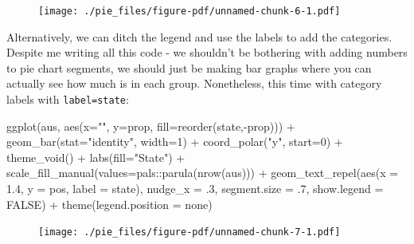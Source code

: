 \documentclass[
  letterpaper,
  DIV=11,
  numbers=noendperiod]{scrreprt}
\newenvironment{Shaded}{\begin{snugshade}}{\end{snugshade}}
\newcommand{\AttributeTok}[1]{\textcolor[rgb]{0.40,0.45,0.13}{#1}}
\newcommand{\ConstantTok}[1]{\textcolor[rgb]{0.56,0.35,0.01}{#1}}
\newcommand{\DecValTok}[1]{\textcolor[rgb]{0.68,0.00,0.00}{#1}}
\newcommand{\FloatTok}[1]{\textcolor[rgb]{0.68,0.00,0.00}{#1}}
\newcommand{\FunctionTok}[1]{\textcolor[rgb]{0.28,0.35,0.67}{#1}}
\newcommand{\NormalTok}[1]{\textcolor[rgb]{0.00,0.23,0.31}{#1}}
\newcommand{\SpecialCharTok}[1]{\textcolor[rgb]{0.37,0.37,0.37}{#1}}
\newcommand{\StringTok}[1]{\textcolor[rgb]{0.13,0.47,0.30}{#1}}
\begin{document}
\begin{figure}[H]

{\centering \texttt{[image: ./pie\_files/figure-pdf/unnamed-chunk-6-1.pdf]}

}

\end{figure}

Alternatively, we can ditch the legend and use the labels to add the
categories. Despite me writing all this code - we shouldn't be bothering
with adding numbers to pie chart segments, we should just be making bar
graphs where you can actually see how much is in each group.
Nonetheless, this time with category labels with \texttt{label=state}:

\begin{Shaded}
\begin{Highlighting}[]
\FunctionTok{ggplot}\NormalTok{(aus, }\FunctionTok{aes}\NormalTok{(}\AttributeTok{x=}\StringTok{""}\NormalTok{, }\AttributeTok{y=}\NormalTok{prop, }\AttributeTok{fill=}\FunctionTok{reorder}\NormalTok{(state,}\SpecialCharTok{{-}}\NormalTok{prop))) }\SpecialCharTok{+}
  \FunctionTok{geom\_bar}\NormalTok{(}\AttributeTok{stat=}\StringTok{"identity"}\NormalTok{, }\AttributeTok{width=}\DecValTok{1}\NormalTok{) }\SpecialCharTok{+}
  \FunctionTok{coord\_polar}\NormalTok{(}\StringTok{"y"}\NormalTok{, }\AttributeTok{start=}\DecValTok{0}\NormalTok{) }\SpecialCharTok{+}
  \FunctionTok{theme\_void}\NormalTok{() }\SpecialCharTok{+}
  \FunctionTok{labs}\NormalTok{(}\AttributeTok{fill=}\StringTok{"State"}\NormalTok{) }\SpecialCharTok{+}
  \FunctionTok{scale\_fill\_manual}\NormalTok{(}\AttributeTok{values=}\NormalTok{pals}\SpecialCharTok{::}\FunctionTok{parula}\NormalTok{(}\FunctionTok{nrow}\NormalTok{(aus))) }\SpecialCharTok{+}
  \FunctionTok{geom\_text\_repel}\NormalTok{(}\FunctionTok{aes}\NormalTok{(}\AttributeTok{x =} \FloatTok{1.4}\NormalTok{, }\AttributeTok{y =}\NormalTok{ pos, }\AttributeTok{label =}\NormalTok{ state), }
                    \AttributeTok{nudge\_x =}\NormalTok{ .}\DecValTok{3}\NormalTok{, }
                    \AttributeTok{segment.size =}\NormalTok{ .}\DecValTok{7}\NormalTok{, }
                    \AttributeTok{show.legend =} \ConstantTok{FALSE}\NormalTok{) }\SpecialCharTok{+}
  \FunctionTok{theme}\NormalTok{(}\AttributeTok{legend.position =} \StringTok{\textquotesingle{}none\textquotesingle{}}\NormalTok{)}
\end{Highlighting}
\end{Shaded}

\begin{figure}[H]

{\centering \texttt{[image: ./pie\_files/figure-pdf/unnamed-chunk-7-1.pdf]}

}

\end{figure}
\end{document}
